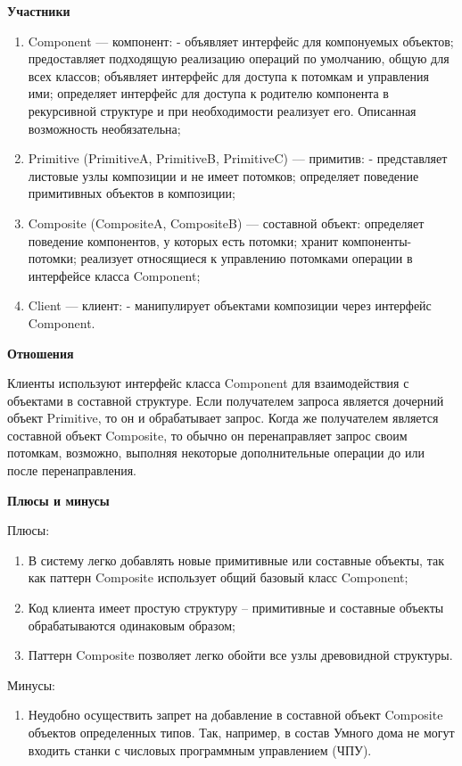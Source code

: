 \documentclass[PI,LAB]{HSEUniversity}
\begin{document}
\textbf{Участники}

\begin{enumerate}
  \item Component --- компонент: - объявляет интерфейс для компонуемых объектов; предоставляет подходящую реализацию операций по умолчанию, общую для всех классов; объявляет интерфейс для доступа к потомкам и управления ими; определяет интерфейс для доступа к родителю компонента в рекурсивной структуре и при необходимости реализует его. Описанная возможность необязательна;
  \item Primitive (PrimitiveA, PrimitiveB, PrimitiveC) --- примитив: - представляет листовые узлы композиции и не имеет потомков; определяет поведение примитивных объектов в композиции;
  \item Composite (CompositeA, CompositeB) --- составной объект: определяет поведение компонентов, у которых есть потомки; хранит компоненты-потомки; реализует относящиеся к управлению потомками операции в интерфейсе класса Component;
  \item Client --- клиент: - манипулирует объектами композиции через интерфейс Component.
\end{enumerate}

\textbf{Отношения}

Клиенты используют интерфейс класса Component для взаимодействия с объектами в составной структуре. Если получателем запроса является дочерний объект Primitive, то он и обрабатывает запрос. Когда же получателем является составной объект Composite, то обычно он перенаправляет запрос своим потомкам, возможно, выполняя некоторые дополнительные операции до или после перенаправления.

\textbf{Плюсы и минусы}

Плюсы:
\begin{enumerate}
  \item В систему легко добавлять новые примитивные или составные объекты, так как паттерн Composite использует общий базовый класс Component;
  \item Код клиента имеет простую структуру – примитивные и составные объекты обрабатываются одинаковым образом;
  \item Паттерн Composite позволяет легко обойти все узлы древовидной структуры.
\end{enumerate}

Минусы:
\begin{enumerate}
  \item Неудобно осуществить запрет на добавление в составной объект Composite объектов определенных типов. Так, например, в состав Умного дома не могут входить станки с числовых программным управлением (ЧПУ).
\end{enumerate}
\end{document}
